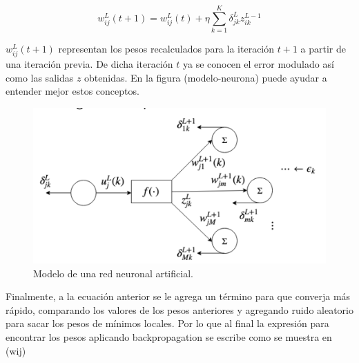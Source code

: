 \documentclass{article}
\begin{document}
  \[
    w_{ij}^{L}(t+1) = w_{ij}^{L}(t) + \eta
    \sum_{k=1}^{K}\delta_{jk}^{L}z_{ik}^{L-1}
  \]

  $w_{ij}^{L}(t+1)$ representan los pesos recalculados para la iteración $t + 1$
  a partir de una iteración previa. De dicha iteración $t$ ya se conocen el
  error modulado así como las salidas $z$ obtenidas. En la figura
  (modelo-neurona) puede ayudar a entender mejor estos conceptos.

  \begin{figure}[ht!]
    \centering
    \includegraphics[width=0.9\linewidth]{backpropagation}
    \caption{Modelo de una red neuronal artificial.}
  \end{figure}

  Finalmente, a la ecuación anterior se le agrega un término para que converja
  más rápido, comparando los valores de los pesos anteriores y agregando ruido
  aleatorio para sacar los pesos de mínimos locales. Por lo que al final la
  expresión para encontrar los pesos aplicando backpropagation se escribe como
  se muestra en (wij)
\end{document}

